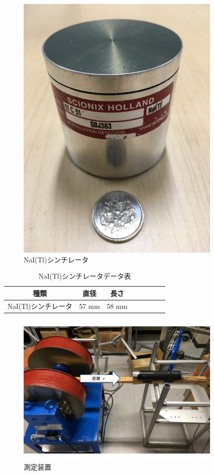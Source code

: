 \begin{figure}[htb]
	\centering
		\includegraphics[width=10cm]{fig/iguchi/NaIscinti.jpg}
	\caption{NaI(Tl)シンチレータ}
	\label{NaIscinti}
\end{figure}

\begin{table}[htb]
	\centering
	
	  \begin{tabular}{cccccccc} \hline
		種類& 直径 & 長さ  \\ \hline \hline
		NaI(Tl)シンチレータ & 57 mm & 58 mm \\ \hline
	\end{tabular}
	  \caption{NaI(Tl)シンチレータデータ表}
\end{table}

\begin{figure}[H]
	\centering
		\includegraphics[width=10cm]{fig/iguchi/2inchsokutei.pdf}
	\caption{測定装置}
	\label{2inchsokutei}
\end{figure}

